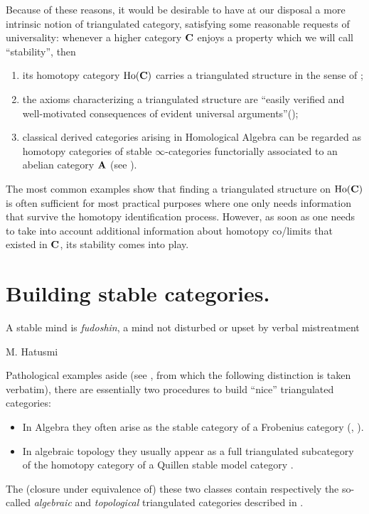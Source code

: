 Because of these reasons, it would be desirable to have at our disposal a more intrinsic notion of triangulated category, satisfying some reasonable requests of universality: whenever a higher category $\mathbf{C}$ enjoys a property which we will call ``stability'', then
\begin{enumerate}[label=\smallcap{sc}\oldstylenums{\arabic*})]
\item \label{fst.sc} its homotopy category $\text{Ho}(\mathbf{C})$ carries a triangulated structure in the sense of \adef {};
\item the axioms characterizing a triangulated structure are ``easily verified and well\hyp{}motivated consequences of evident universal arguments''(\cite[Remark \textbf{1.1.2.16}]{LurieHA});
\item \label{last.sc} classical derived categories arising in Homological Algebra can be regarded as homotopy categories of stable $\infty$\hyp{}categories functorially associated to an abelian category $\mathbf{A}$ (see \cite[\S \textbf{1.3.1}]{LurieHA}).
\end{enumerate}
The most common examples show that finding a triangulated structure on $\text{Ho}(\mathbf{C})$ is often sufficient for most practical purposes where one only needs information that survive the homotopy identification process. However, as soon as one needs to take into account additional information about homotopy co\fshyp{}limits that existed in $\mathbf{C}$, its stability comes into play.
\section{Building stable categories.}\label{buildingstab}
\epigraph{A stable mind is \emph{fudoshin}, a mind not disturbed or upset by verbal mistreatment}{M\@. Hatusmi}
Pathological examples aside (see \cite{FMS}, from which the following distinction is taken verbatim), there are essentially two procedures to build ``nice'' triangulated categories:
\begin{itemize}
\item In Algebra they often arise as the stable category of a Frobenius category (\cite[\textbf{4.4}]{shc}, \cite[\textbf{IV.3} Exercise \textbf{8}]{gelfand2013methods}).
\item In algebraic topology they usually appear as a full triangulated subcategory of the homotopy category of a Quillen stable model category \cite[\textbf{7.1}]{Hov}.
\end{itemize}
The (closure under equivalence of) these two classes contain respectively the so\hyp{}called \emph{algebraic} and \emph{topological} triangulated categories described in \cite{Schwede2010}.


